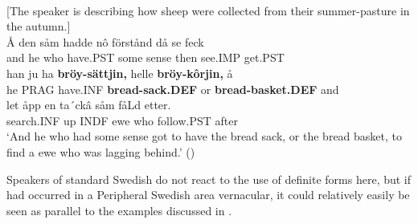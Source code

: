 \ea \label{} 
\\
{}[The speaker is describing how sheep were collected from their summer-pasture in the autumn.]\\
\gll 	Å  den  såm  hadde  nô  förstånd  då  se  feck\\
		and  he  who  have.PST  some  sense  then  see.IMP  get.PST\\
\gll 	han  ju  ha  \textbf{bröy-sättjin,} helle  \textbf{bröy-kôrjin,} å\\
		he  PRAG  have.INF  \textbf{bread-sack.DEF} or  \textbf{bread-basket.DEF} and\\
\gll 	le{\textasciigrave}t  åpp  en  ta´ckâ  såm  fåLd  etter.\\
		search.INF  up  INDF  ewe  who  follow.PST  after\\
\glt  ‘And he who had some sense got to have the bread sack, or the bread basket, to find a ewe who was lagging behind.’ (\citet[33]{KällskogEtAl1993})

\z

Speakers of standard Swedish do not react to the use of definite forms here, but if  had occurred in a Peripheral Swedish area vernacular, it could relatively easily be seen as parallel to the examples discussed in .

